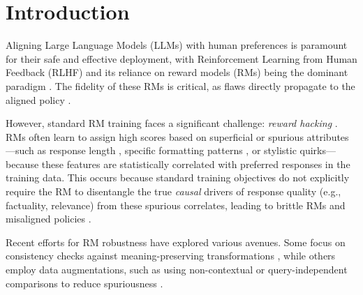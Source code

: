 \vspace{-0.1cm}
\section{Introduction}
\label{sec:introduction}

Aligning Large Language Models (LLMs) with human preferences is paramount for their safe and effective deployment, with Reinforcement Learning from Human Feedback (RLHF) and its reliance on reward models (RMs) being the dominant paradigm \citep{christiano2017deep, ouyang2022training, bai2022training, schulman2017proximal, shao2024deepseekmath, rafailov2024direct}. The fidelity of these RMs is critical, as flaws directly propagate to the aligned policy \citep{casper2023open}. 

However, standard RM training faces a significant challenge: \textit{reward hacking} \citep{gao2023scaling, skalse2022defining}. RMs often learn to assign high scores based on superficial or spurious attributes—such as response length \citep{singhal2023long}, specific formatting patterns \citep{zhang2024lists}, or stylistic quirks—because these features are statistically correlated with preferred responses in the training data. This occurs because standard training objectives do not explicitly require the RM to disentangle the true \textit{causal} drivers of response quality (e.g., factuality, relevance) from these spurious correlates, leading to brittle RMs and misaligned policies \citep{shen2023trickle, eisenstein2023helping}.



Recent efforts for RM robustness have explored various avenues. Some focus on consistency checks against meaning-preserving transformations \citep{wu2025rewordbench}, while others employ data augmentations, such as using non-contextual or query-independent comparisons to reduce spuriousness \citep{liu2024rrm}. 

